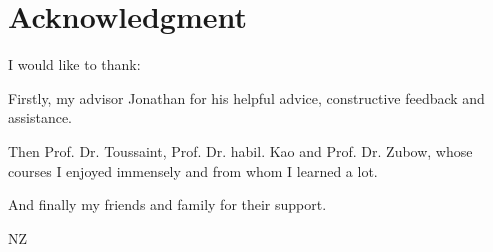 
\cleardoublepage
{}
\section*{Acknowledgment}

I would like to thank:

Firstly, my advisor Jonathan for his helpful advice, constructive feedback and assistance.

Then Prof. Dr. Toussaint, Prof. Dr. habil. Kao and Prof. Dr. Zubow, whose courses I enjoyed immensely and from whom I learned a lot.

And finally my friends and family for their support.  


\begin{flushright}
NZ\\[1pc]
\end{flushright}
